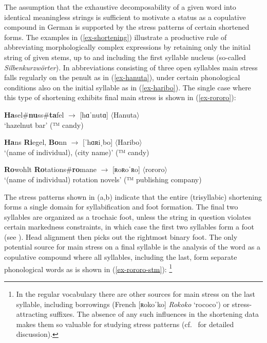 \documentclass[output=paper
 ,nobabel
 ,draftmode
 ,colorlinks, citecolor=brown
]{langscibook}
\begin{document}
\noindent
The assumption that the exhaustive decomposability of a given word into identical meaningless
strings is sufficient to motivate a status as a copulative compound in German is supported by the
stress patterns of certain shortened forms. The examples in (\ref{ex-shortening}) illustrate a
productive rule of abbreviating morphologically complex expressions by retaining only the initial
string of given stems, up to and including the first syllable nucleus (so-called
\emph{Silbenkurzwörter}). In abbreviations consisting of three open syllables main stress falls
regularly on the penult as in (\ref{ex-hanuta}), under certain phonological conditions also on the
initial syllable as in (\ref{ex-haribo}). The single case where this type of shortening exhibits
final main stress is shown in (\ref{ex-rororo}):  

\eal\label{ex-shortening}
\ex\label{ex-hanuta}
\textbf{Ha}sel\#\textbf{nu}ss\#\textbf{ta}fel $\rightarrow$
[hɑˈnutɑ] $\langle$Hanuta$\rangle$\\
`hazelnut bar' (™ candy)

\ex\label{ex-haribo}
\textbf{Ha}ns \textbf{Ri}egel, \textbf{Bo}nn
$\rightarrow$ [ˈhɑʀiˌbo] $\langle$Haribo$\rangle$\\
`(name of individual), (city name)' (™ candy)

\ex\label{ex-rororo}
\textbf{Ro}wohlt \textbf{Ro}tations\#\textbf{ro}mane $\rightarrow$
[ʀoʀoˈʀo] $\langle$rororo$\rangle$\\
`(name of individual) rotation novels' (™ publishing company)
\zl

\largerpage[2]
\noindent
The stress patterns shown in (a,b) indicate that the entire (trisyllabic) shortening forms a single domain for syllabification and foot formation. The final two syllables are organized as a trochaic foot, unless the string in question violates certain markedness constraints, in which case the first two syllables form a foot (see \citet[91--92]{Raffelsiefen2021}).  Head alignment then picks out the rightmost binary foot. The only potential source for main stress on a final syllable is the analysis of the word as a copulative compound where all syllables, including the last, form separate phonological words as is shown in (\ref{ex-rororo-stm}):%
%
\footnote{In the regular vocabulary there are other sources for main stress on the last syllable, including borrowings (\eg French [ʀokoˈko] \emph{Rokoko} `rococo') or stress-attracting suffixes. The absence of any such influences in the shortening data makes them so valuable for studying stress patterns (cf.\ \citealp{Raffelsiefen2021} for detailed discussion).}
\end{document}
